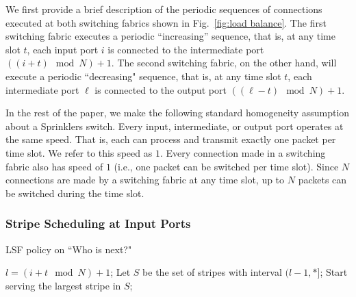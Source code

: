 We first provide a brief description of the periodic sequences of connections executed at both switching fabrics shown in Fig.~\ref{fig:load balance}.
The first switching fabric executes a periodic ``increasing'' sequence, that is, at any time slot $t$, each input port $i$ is connected
to the intermediate port $((i + t) \mod N) + 1$.  
The second switching fabric, on the other hand, will execute a periodic ``decreasing" sequence, that is, 
at any time slot $t$, each intermediate port $\ell$ is connected to the output port $((\ell - t) \mod N)+1$.  

In the rest of the paper, we make the following standard homogeneity assumption about a Sprinklers switch.  
Every input, intermediate, or output port
operates at the same speed.  That is, each can process and transmit exactly one packet per time slot.  We refer to this speed
as $1$.  Every connection made in a switching fabric also has speed of $1$ (i.e., one packet can be switched per time slot).
Since $N$ connections are made by a switching fabric at any time slot, up to $N$ packets can be switched during the time 
slot.













\subsubsection{Stripe Scheduling at Input Ports}
\label{sec:scheduling input}







\begin{algorithm}
\caption{LSF policy on ``Who is next?"}
\label{alg:select next VOQ to serve}
  \begin{algorithmic}[1]
  \State $l = (i + t \mod N) + 1$; 
      \State Let $S$ be the set of stripes with interval $(l-1, *]$;
        \State Start serving the largest stripe in $S$;
\EndIf
    \EndIf
  \end{algorithmic}
\end{algorithm}



